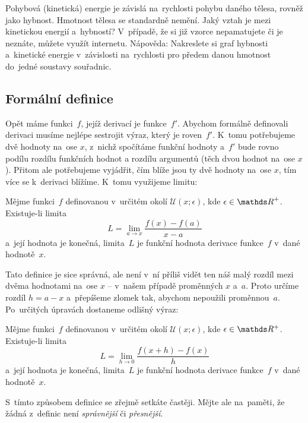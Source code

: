 \begin{exercise}
    Pohybová (kinetická) energie je závislá na~rychlosti pohybu daného tělesa, rovněž
    jako hybnost. Hmotnost tělesa se standardně nemění. Jaký vztah je mezi kinetickou
    energií a~hybností? V~případě, že si již vzorce nepamatujete či je neznáte,
    můžete využít internetu. Nápověda: Nakreslete si graf hybnosti a~kinetické
    energie v~závislosti na~rychlosti pro předem danou hmotnost do~jedné soustavy
    souřadnic.
\end{exercise}

\subsection{Formální definice}
\label{subsec:derivace-definice-formal}

Opět máme funkci~$f$, jejíž derivací je funkce~$f'$. Abychom formálně definovali
derivaci musíme nejlépe sestrojit výraz, který je roven~$f'$. K~tomu potřebujeme dvě
hodnoty na~ose $x$, z~nichž spočítáme funkční hodnoty a~$f'$ bude rovno podílu
rozdílu funkčních hodnot a rozdílu argumentů (těch dvou hodnot na~ose $x$). Přitom
ale potřebujeme vyjádřit, čím blíže jsou ty dvě hodnoty na~ose $x$, tím více se
k~derivaci blížíme. K~tomu využijeme limitu:

\begin{definition}
    Mějme funkci~$f$ definovanou v~určitém okolí ${\mathcal{U}(x; \epsilon)}$, kde
    ${\epsilon \in \positive\reals}$. Existuje-li limita
    \begin{equation*}
        L = \lim_{a \to x} \frac{f(x) - f(a)}{x - a}
    \end{equation*}
    a~její hodnota je konečná, limita~$L$ je funkční hodnota derivace funkce~$f$
    v~dané hodnotě~$x$.
\end{definition}

Tato definice je sice správná, ale není v~ní příliš vidět ten náš malý rozdíl mezi
dvěma hodnotami na~ose $x$ -- v~našem případě proměnných $x$ a~$a$. Proto určíme
rozdíl $h = a - x$ a~přepíšeme zlomek tak, abychom nepoužili proměnnou~$a$.
Po~určitých úpravách dostaneme odlišný výraz:

\begin{definition}
    Mějme funkci~$f$ definovanou v~určitém okolí ${\mathcal{U}(x; \epsilon)}$, kde
    ${\epsilon \in \reals^{+}}$. Existuje-li limita
    \begin{equation*}
        L = \lim_{h \to 0} \frac{f(x + h) - f(x)}{h}
    \end{equation*}
    a~její hodnota je konečná, limita~$L$ je funkční hodnota derivace funkce~$f$
    v~dané hodnotě~$x$.
\end{definition}

S~tímto způsobem definice se zřejmě setkáte častěji. Mějte ale na~paměti, že žádná
z~definic není \emph{správnější} či \emph{přesnější}.